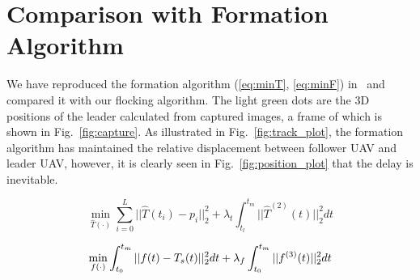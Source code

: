 \newpage

\section{Comparison with Formation Algorithm}\label{tracking}

We have reproduced the formation algorithm (\ref{eq:minT}, \ref{eq:minF}) in~\cite{Chenjing} and compared it with our flocking algorithm. The light green dots are the 3D positions of the leader calculated from captured images, a frame of which is shown in Fig.~\ref{fig:capture}.  As illustrated in Fig.~\ref{fig:track_plot}, the formation algorithm has maintained the relative displacement between follower UAV and leader UAV, however, it is clearly seen in Fig.~\ref{fig:position_plot} that the delay is inevitable.

\begin{equation}\label{eq:minT}
\min_{\hat{T}(\cdot)} \sum^{L}_{i=0} ||\hat{T}(t_i)-p_i||^2_2 + \lambda_t\int_{t_l}^{t_m} ||\hat{T}^{(2)}(t)||^2_2dt
\end{equation}

\begin{equation}\label{eq:minF}
\min_{f(\cdot)} \int_{t_0}^{t_m} ||f(t)-T_s(t)||^2_{2}dt + \lambda_f\int_{t_0}^{t_m} ||f^{(3)}(t)||^2_{2}dt\\
\end{equation}

